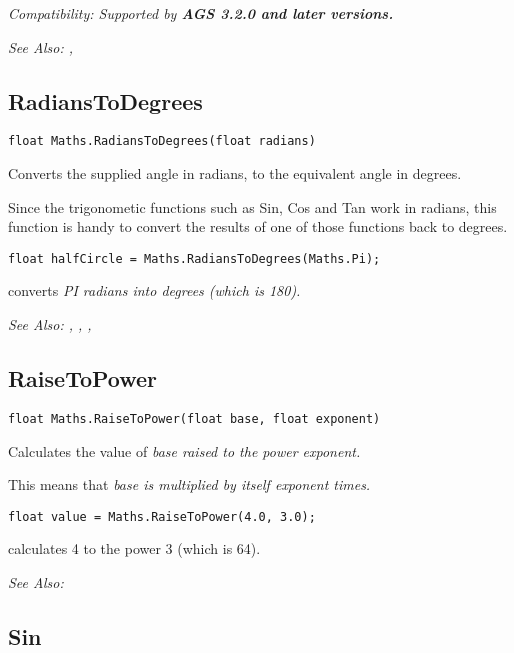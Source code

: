 \it{Compatibility:} Supported by \bf{AGS 3.2.0} and later versions.

\it{See Also:} , 


\subsection{RadiansToDegrees}\label{Maths.RadiansToDegrees}%

\begin{verbatim}
float Maths.RadiansToDegrees(float radians)
\end{verbatim}
Converts the supplied angle in radians, to the equivalent angle in degrees.

Since the trigonometic functions such as Sin, Cos and Tan work in radians, this
function is handy to convert the results of one of those functions back to degrees.

\begin{verbatim}
float halfCircle = Maths.RadiansToDegrees(Maths.Pi);
\end{verbatim}
converts \it{PI} radians into degrees (which is 180).

\it{See Also:} ,
,
, 


\subsection{RaiseToPower}\label{Maths.RaiseToPower}%

\begin{verbatim}
float Maths.RaiseToPower(float base, float exponent)
\end{verbatim}
Calculates the value of \it{base} raised to the power \it{exponent}.

This means that \it{base} is multiplied by itself \it{exponent} times.

\begin{verbatim}
float value = Maths.RaiseToPower(4.0, 3.0);
\end{verbatim}
calculates 4 to the power 3 (which is 64).

\it{See Also:} 


\subsection{Sin}\label{Maths.Sin}%

